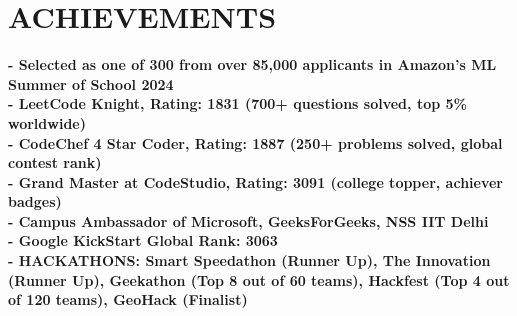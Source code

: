 \documentclass[letterpaper,11pt]{article}
\begin{document}
\section{\textbf{ACHIEVEMENTS}}
\begin{itemize}[leftmargin=0.15in, label={}]
    \small{\item{
    \textbf{- Selected as one of 300 from over 85,000 applicants in Amazon's ML Summer of School 2024} \\
    \textbf{- LeetCode Knight, Rating: 1831 (700+ questions solved, top 5\% worldwide)} \\
    \textbf{- CodeChef 4 Star Coder, Rating: 1887 (250+ problems solved, global contest rank)} \\
    \textbf{- Grand Master at CodeStudio, Rating: 3091 (college topper, achiever badges)} \\
    \textbf{- Campus Ambassador of Microsoft, GeeksForGeeks, NSS IIT Delhi} \\
    \textbf{- Google KickStart Global Rank: 3063} \\
    \textbf{- HACKATHONS: Smart Speedathon (Runner Up), The Innovation (Runner Up), Geekathon (Top 8 out of 60 teams), Hackfest (Top 4 out of 120 teams), GeoHack (Finalist)} \\
    }}
\end{itemize}
\end{document}
